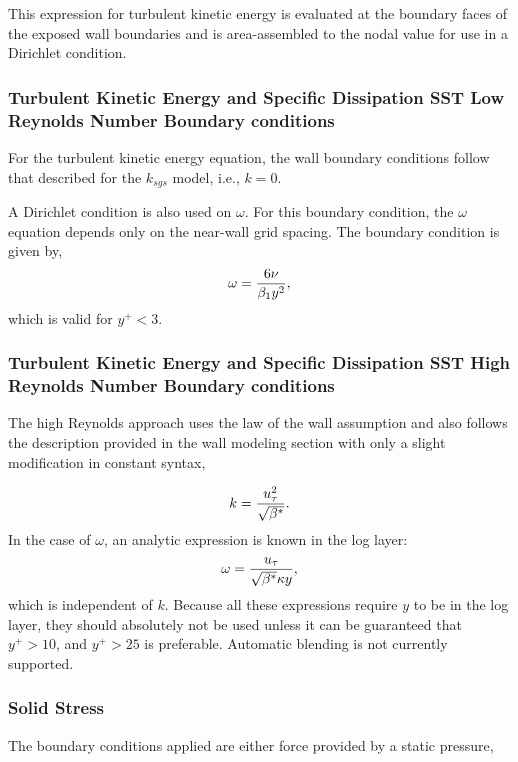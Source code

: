 {This expression for turbulent kinetic energy is evaluated at the boundary faces of the
exposed wall boundaries and is area-assembled to the nodal value for use in a Dirichlet condition.

\subsubsection{Turbulent Kinetic Energy and Specific Dissipation SST Low Reynolds Number Boundary conditions}

For the turbulent kinetic energy equation, the wall boundary conditions follow that described for 
the $k_{sgs}$ model, i.e., $k=0$.

A Dirichlet condition is also used on $\omega$.  For this boundary condition, the $\omega$ equation depends only on the near-wall 
grid spacing.  The boundary condition is given by,
\begin{equation}
\omega = {6 \nu \over \beta_1 y^{2}},
\end{equation}
which is valid for $y^{+} < 3$. 

\subsubsection{Turbulent Kinetic Energy and Specific Dissipation SST High Reynolds Number Boundary conditions}
The high Reynolds approach uses the law of the wall assumption and also follows the description 
provided in the wall modeling section with only a slight modification in constant syntax,

\begin{equation}
k = {u_{\tau}^{2} \over \sqrt{\beta^*}}.
\label{wallModelTke}
\end{equation}
% 
In the case of $\omega$, an analytic expression is known in the log layer:
\begin{equation}
\omega = {u_{\tau} \over \sqrt{\beta^*} \kappa y},
\end{equation}
which is independent of $k$.  Because all these expressions require $y$ to be in the log layer, 
they should absolutely not be used unless it can be guaranteed that $y^{+} > 10$, and $y^{+} > 25$ is preferable.
%
Automatic blending is not currently supported.

\subsubsection{Solid Stress}
The boundary conditions applied are either force provided by a static pressure, 

}
